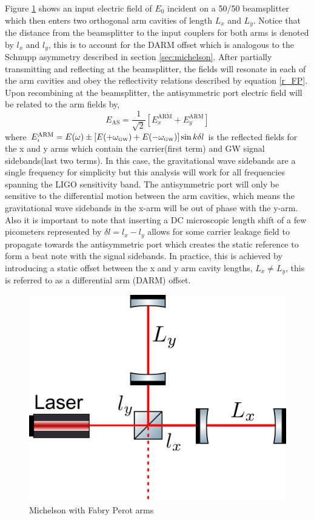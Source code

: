 		Figure \ref{fig:FPMichelson} shows an input electric field of $E_0$ incident on a 50/50 beamsplitter which then enters two orthogonal arm cavities of length $L_x$ and $L_y$.  Notice that the distance from the beamsplitter to the input couplers for both arms is denoted by $l_x$ and $l_y$, this is to account for the DARM offset which is analogous to the Schnupp asymmetry described in section \ref{sec:michelson}.  After partially transmitting and reflecting at the beamsplitter, the fields will resonate in each of the arm cavities and obey the reflectivity relations described by equation \ref{r_FP}.  Upon recombining at the beamsplitter, the antisymmetric port electric field will be related to the arm fields by,
		\begin{equation}
		E_{\text{AS}} = \frac{1}{\sqrt{2}} [E_{x}^{\text{ARM}} + E_{y}^{\text{ARM}} ] 
		\end{equation}
		where $E_{i}^{\text{ARM}} = E(\omega) \pm [E(+ \omega_{\text{\tiny GW}}) + E(- \omega_{\text{\tiny GW}})] \sin{k\delta l } $ is the reflected fields for the x and y arms which contain the carrier(first term) and GW signal sidebands(last two terms).  In this case, the gravitational wave sidebands are a single frequency for simplicity but this analysis will work for all frequencies spanning the LIGO sensitivity band.  The antisymmetric port will only be sensitive to the differential motion between the arm cavities, which means the gravitational wave sidebands in the x-arm will be out of phase with the y-arm.  Also it is important to note that inserting a DC microscopic length shift of a few picometers represented by $\delta l = l_x - l_y$ allows for some carrier leakage field to propagate towards the antisymmetric port which creates the static reference to form a beat note with the signal sidebands.  In practice, this is achieved by introducing a static offset between the x and y arm cavity lengths, $L_x \neq L_y$, this is referred to as a differential arm (DARM) offset.
				
		\begin{figure}[ht]
			\centering
			\includegraphics[width=.5 \textwidth]{../Figures/FP_Mich.png}
			\caption{Michelson with Fabry Perot arms}
			\label{fig:FPMichelson}
		\end{figure}
	
